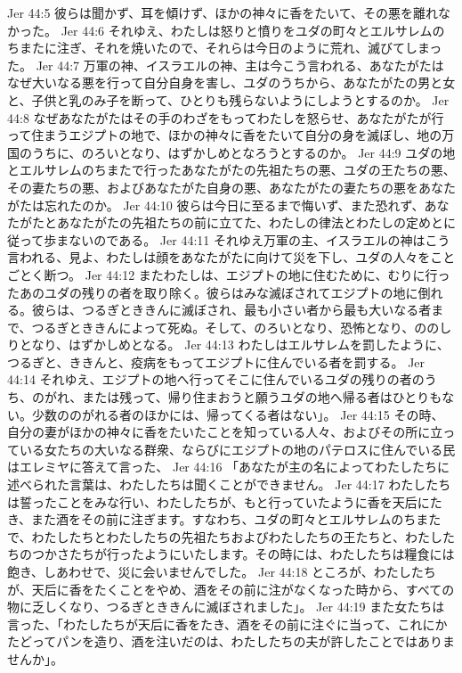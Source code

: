 Jer 44:5  彼らは聞かず、耳を傾けず、ほかの神々に香をたいて、その悪を離れなかった。
Jer 44:6  それゆえ、わたしは怒りと憤りをユダの町々とエルサレムのちまたに注ぎ、それを焼いたので、それらは今日のように荒れ、滅びてしまった。
Jer 44:7  万軍の神、イスラエルの神、主は今こう言われる、あなたがたはなぜ大いなる悪を行って自分自身を害し、ユダのうちから、あなたがたの男と女と、子供と乳のみ子を断って、ひとりも残らないようにしようとするのか。
Jer 44:8  なぜあなたがたはその手のわざをもってわたしを怒らせ、あなたがたが行って住まうエジプトの地で、ほかの神々に香をたいて自分の身を滅ぼし、地の万国のうちに、のろいとなり、はずかしめとなろうとするのか。
Jer 44:9  ユダの地とエルサレムのちまたで行ったあなたがたの先祖たちの悪、ユダの王たちの悪、その妻たちの悪、およびあなたがた自身の悪、あなたがたの妻たちの悪をあなたがたは忘れたのか。
Jer 44:10  彼らは今日に至るまで悔いず、また恐れず、あなたがたとあなたがたの先祖たちの前に立てた、わたしの律法とわたしの定めとに従って歩まないのである。
Jer 44:11  それゆえ万軍の主、イスラエルの神はこう言われる、見よ、わたしは顔をあなたがたに向けて災を下し、ユダの人々をことごとく断つ。
Jer 44:12  またわたしは、エジプトの地に住むために、むりに行ったあのユダの残りの者を取り除く。彼らはみな滅ぼされてエジプトの地に倒れる。彼らは、つるぎとききんに滅ぼされ、最も小さい者から最も大いなる者まで、つるぎとききんによって死ぬ。そして、のろいとなり、恐怖となり、ののしりとなり、はずかしめとなる。
Jer 44:13  わたしはエルサレムを罰したように、つるぎと、ききんと、疫病をもってエジプトに住んでいる者を罰する。
Jer 44:14  それゆえ、エジプトの地へ行ってそこに住んでいるユダの残りの者のうち、のがれ、または残って、帰り住まおうと願うユダの地へ帰る者はひとりもない。少数ののがれる者のほかには、帰ってくる者はない」。
Jer 44:15  その時、自分の妻がほかの神々に香をたいたことを知っている人々、およびその所に立っている女たちの大いなる群衆、ならびにエジプトの地のパテロスに住んでいる民はエレミヤに答えて言った、
Jer 44:16  「あなたが主の名によってわたしたちに述べられた言葉は、わたしたちは聞くことができません。
Jer 44:17  わたしたちは誓ったことをみな行い、わたしたちが、もと行っていたように香を天后にたき、また酒をその前に注ぎます。すなわち、ユダの町々とエルサレムのちまたで、わたしたちとわたしたちの先祖たちおよびわたしたちの王たちと、わたしたちのつかさたちが行ったようにいたします。その時には、わたしたちは糧食には飽き、しあわせで、災に会いませんでした。
Jer 44:18  ところが、わたしたちが、天后に香をたくことをやめ、酒をその前に注がなくなった時から、すべての物に乏しくなり、つるぎとききんに滅ぼされました」。
Jer 44:19  また女たちは言った、「わたしたちが天后に香をたき、酒をその前に注ぐに当って、これにかたどってパンを造り、酒を注いだのは、わたしたちの夫が許したことではありませんか」。
